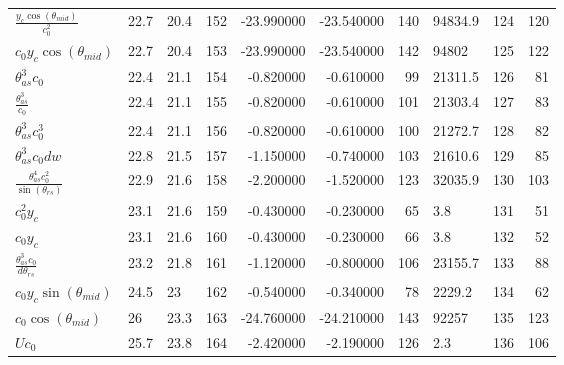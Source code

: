 \begin{tabularx}{\textwidth}{lllrrrrlrr}
$ \displaystyle\frac{y_c \cos{\left(\theta_{mid} \right)}}{c_{0}^{2}} $  &  22.7  &  20.4  &  152  &  -23.990000  &  -23.540000  &  140  &  94834.9  &  124\phantom{.000000}  &  120\phantom{.000000}  \\ 
$ c_{0} y_c \cos{\left(\theta_{mid} \right)} $  &  22.7  &  20.4  &  153  &  -23.990000  &  -23.540000  &  142  &  94802\phantom{.0}  &  125\phantom{.000000}  &  122\phantom{.000000}  \\ 
$ \theta_{as}^{3} c_{0} $  &  22.4  &  21.1  &  154  &  -0.820000  &  -0.610000  &  99  &  21311.5  &  126\phantom{.000000}  &  81\phantom{.000000}  \\ 
$ \displaystyle\frac{\theta_{as}^{3}}{c_{0}} $  &  22.4  &  21.1  &  155  &  -0.820000  &  -0.610000  &  101  &  21303.4  &  127\phantom{.000000}  &  83\phantom{.000000}  \\ 
$ \theta_{as}^{3} c_{0}^{3} $  &  22.4  &  21.1  &  156  &  -0.820000  &  -0.610000  &  100  &  21272.7  &  128\phantom{.000000}  &  82\phantom{.000000}  \\ 
$ \theta_{as}^{3} c_{0} d w $  &  22.8  &  21.5  &  157  &  -1.150000  &  -0.740000  &  103  &  21610.6  &  129\phantom{.000000}  &  85\phantom{.000000}  \\ 
$ \displaystyle\frac{\theta_{as}^{4} c_{0}^{2}}{\sin{\left(\theta_{rs} \right)}} $  &  22.9  &  21.6  &  158  &  -2.200000  &  -1.520000  &  123  &  32035.9  &  130\phantom{.000000}  &  103\phantom{.000000}  \\ 
$ c_{0}^{2} y_c $  &  23.1  &  21.6  &  159  &  -0.430000  &  -0.230000  &  65  &  3.8  &  131\phantom{.000000}  &  51\phantom{.000000}  \\ 
$ c_{0} y_c $  &  23.1  &  21.6  &  160  &  -0.430000  &  -0.230000  &  66  &  3.8  &  132\phantom{.000000}  &  52\phantom{.000000}  \\ 
$ \displaystyle\frac{\theta_{as}^{3} c_{0}}{d \theta_{rs}} $  &  23.2  &  21.8  &  161  &  -1.120000  &  -0.800000  &  106  &  23155.7  &  133\phantom{.000000}  &  88\phantom{.000000}  \\ 
$ c_{0} y_c \sin{\left(\theta_{mid} \right)} $  &  24.5  &  23\phantom{.0}  &  162  &  -0.540000  &  -0.340000  &  78  &  2229.2  &  134\phantom{.000000}  &  62\phantom{.000000}  \\ 
$ c_{0} \cos{\left(\theta_{mid} \right)} $  &  26\phantom{.0}  &  23.3  &  163  &  -24.760000  &  -24.210000  &  143  &  92257\phantom{.0}  &  135\phantom{.000000}  &  123\phantom{.000000}  \\ 
$ U c_{0} $  &  25.7  &  23.8  &  164  &  -2.420000  &  -2.190000  &  126  &  2.3  &  136\phantom{.000000}  &  106\phantom{.000000}  \\ 

\end{tabularx}
